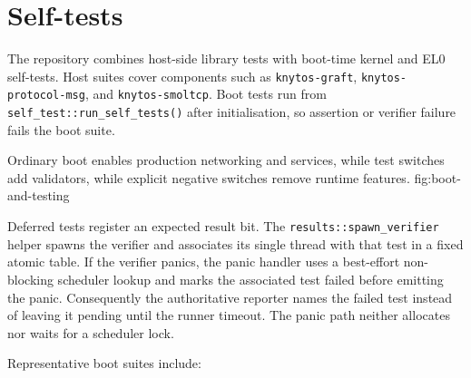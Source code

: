 \section{Self-tests}

The repository combines host-side library tests with boot-time kernel and EL0
self-tests. Host suites cover components such as \texttt{knytos-graft},
\texttt{knytos-protocol-msg}, and \texttt{knytos-smoltcp}. Boot tests run
from \texttt{self\_test::run\_self\_tests()} after initialisation, so assertion or
verifier failure fails the boot suite.

    {Ordinary boot enables production networking and services, while test switches
    add validators, while explicit negative switches remove runtime features.}
    {fig:boot-and-testing}

Deferred tests register an expected result bit. The
\texttt{results::spawn\_verifier} helper spawns the verifier and associates its
single thread with that test in a fixed atomic table. If the verifier
panics, the panic handler uses a best-effort non-blocking scheduler lookup and
marks the associated test failed before emitting the panic. Consequently the
authoritative reporter names the failed test instead of leaving it pending
until the runner timeout. The panic path neither allocates nor waits for a
scheduler lock.

Representative boot suites include:

